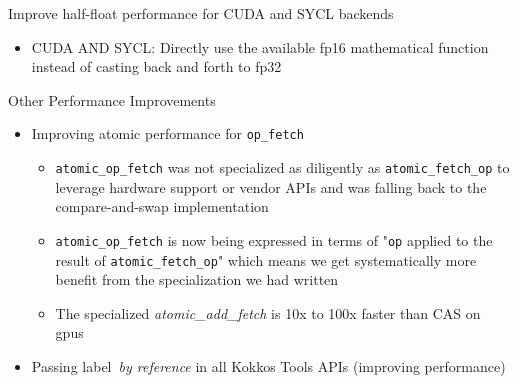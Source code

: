 \begin{frame}[fragile]{Improve half-float performance for CUDA and SYCL backends}
  \begin{itemize}
    \item CUDA AND SYCL: Directly use the available fp16 mathematical function instead of casting back and forth to fp32
  \end{itemize}
\end{frame}



\begin{frame}[fragile]{Other Performance Improvements}
  \begin{itemize}
  \item {Improving atomic performance for \texttt{op\_fetch}}
     \begin{itemize}
      \item \texttt{atomic\_op\_fetch} was not specialized as diligently as \texttt{atomic\_fetch\_op} to leverage hardware support or vendor APIs and was falling back to the compare-and-swap implementation
      \item \texttt{atomic\_op\_fetch} is now being expressed in terms of "\texttt{op} applied to the result of \texttt{atomic\_fetch\_op}" which means we get systematically more benefit from the specialization we had written
      \item The specialized \emph{atomic\_add\_fetch} is 10x to 100x faster than CAS on gpus
    \end{itemize}
     \item Passing label~\emph{by reference} in all Kokkos Tools APIs (improving performance)
  \end{itemize}
\end{frame}

